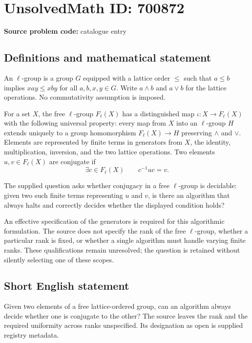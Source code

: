 \documentclass[11pt]{article}
\begin{document}
\section*{UnsolvedMath ID: 700872}
\textbf{Source problem code:} catalogue entry
\subsection{Definitions and mathematical statement}
An \(\ell\)-group is a group \(G\) equipped with a lattice order \(\leq\) such that \(a\leq b\) implies \(xay\leq xby\) for all \(a,b,x,y\in G\). Write \(a\wedge b\) and \(a\vee b\) for the lattice operations. No commutativity assumption is imposed.

For a set \(X\), the free \(\ell\)-group \(F_{\ell}(X)\) has a distinguished map \(\iota:X\to F_{\ell}(X)\) with the following universal property: every map from \(X\) into an \(\ell\)-group \(H\) extends uniquely to a group homomorphism \(F_{\ell}(X)\to H\) preserving \(\wedge\) and \(\vee\). Elements are represented by finite terms in generators from \(X\), the identity, multiplication, inversion, and the two lattice operations. Two elements \(u,v\in F_{\ell}(X)\) are conjugate if
\[
\exists c\in F_{\ell}(X)\qquad c^{-1}uc=v.
\]

The supplied question asks whether conjugacy in a free \(\ell\)-group is decidable: given two such finite terms representing \(u\) and \(v\), is there an algorithm that always halts and correctly decides whether the displayed condition holds?

An effective specification of the generators is required for this algorithmic formulation. The source does not specify the rank of the free \(\ell\)-group, whether a particular rank is fixed, or whether a single algorithm must handle varying finite ranks. These qualifications remain unresolved; the question is retained without silently selecting one of these scopes.
\subsection{Short English statement}
Given two elements of a free lattice-ordered group, can an algorithm always decide whether one is conjugate to the other? The source leaves the rank and the required uniformity across ranks unspecified. Its designation as open is supplied registry metadata.
\end{document}
